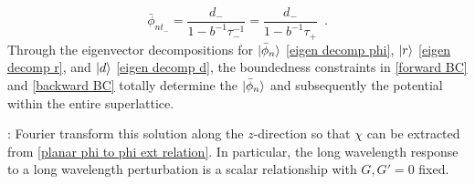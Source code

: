 \documentclass{article}
\begin{document}
\begin{equation}
    \label{backward BC}
    \bar\phi_{nt_-} = \frac{d_-}{1-b^{-1}\tau_-^{-1}} = \frac{d_-}{1-b^{-1}\tau_+}
    \,\,\,.
\end{equation}
Through the eigenvector decompositions for $\lvert\bar\phi_n\rangle$ \eqref{eigen decomp phi}, $\lvert r\rangle$ \eqref{eigen decomp r}, and $\lvert d\rangle$ \eqref{eigen decomp d}, the boundedness constraints in \eqref{forward BC} and \eqref{backward BC} totally determine the $\lvert\bar\phi_n\rangle$ and subsequently the potential within the entire superlattice.

: Fourier transform this solution along the $z$-direction so that $\chi$ can be extracted from \eqref{planar phi to phi ext relation}.  In particular, the long wavelength response to a long wavelength perturbation is a scalar relationship with $G,G'=0$ fixed.
\end{document}
